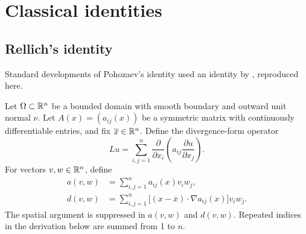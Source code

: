 \chapter{Classical identities}
\label{app:identities}
\section*{Rellich's identity}


Standard developments of Pohozaev's identity used an identity by
\citet{rellich1940darstellung}, reproduced here.


Let $\Omega \subset \mathbb{R}^n$ be a bounded domain with smooth boundary and
outward unit normal $\nu$. Let $A(x) = (a_{ij}(x))$ be a symmetric matrix
with continuously differentiable entries, and fix $\overline{x} \in \mathbb{R}^n$.
Define the divergence-form operator
\[
  Lu = \sum_{i,j=1}^{n}
    \frac{\partial}{\partial x_i}
    \left(a_{ij} \frac{\partial u}{\partial x_j}\right).
\]
For vectors $v,w \in \mathbb{R}^n$, define
\begin{align*}
  a(v,w) &= \sum_{i,j=1}^{n} a_{ij}(x) v_i w_j, \\
  d(v,w) &= \sum_{i,j=1}^{n}
    \bigl[(x - \overline{x}) \cdot \nabla a_{ij}(x)\bigr] v_i w_j.
\end{align*}
The spatial argument is suppressed in $a(v,w)$ and $d(v,w)$. Repeated indices
in the derivation below are summed from 1 to $n$.


